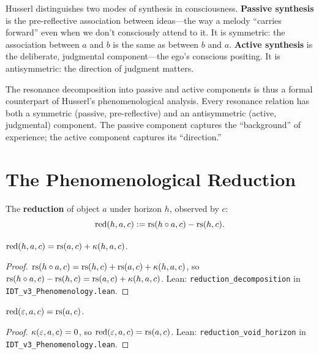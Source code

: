 \begin{interpretation}
\label{interp:two-syntheses}
Husserl distinguishes two modes of synthesis in consciousness.
\textbf{Passive synthesis} is the pre-reflective association between ideas---the
way a melody ``carries forward'' even when we don't consciously attend to it.
It is symmetric: the association between $a$ and $b$ is the same as between
$b$ and $a$. \textbf{Active synthesis} is the deliberate, judgmental component---the
ego's conscious positing. It is antisymmetric: the direction of judgment matters.

The resonance decomposition into passive and active components is thus a formal
counterpart of Husserl's phenomenological analysis. Every resonance relation
has both a symmetric (passive, pre-reflective) and an antisymmetric (active,
judgmental) component. The passive component captures the ``background'' of
experience; the active component captures its ``direction.''
\end{interpretation}

\section{The Phenomenological Reduction}

\begin{definition}
\label{def:reduction}
The \textbf{reduction} of object $a$ under horizon $h$, observed by $c$:
\[
\mathrm{red}(h, a, c) := \mathrm{rs}(h \circ a, c) - \mathrm{rs}(h, c).
\]
\end{definition}

\begin{theorem}
\label{thm:reduction-decomp}
$\mathrm{red}(h, a, c) = \mathrm{rs}(a, c) + \kappa(h, a, c)$.
\end{theorem}

\begin{proof}
$\mathrm{rs}(h \circ a, c) = \mathrm{rs}(h,c) + \mathrm{rs}(a,c) + \kappa(h,a,c)$, so
$\mathrm{rs}(h \circ a, c) - \mathrm{rs}(h,c) = \mathrm{rs}(a,c) + \kappa(h,a,c)$.
Lean: \texttt{reduction\_decomposition} in \texttt{IDT\_v3\_Phenomenology.lean}.
\end{proof}

\begin{theorem}
\label{thm:reduction-void}
$\mathrm{red}(\varepsilon, a, c) = \mathrm{rs}(a, c)$.
\end{theorem}

\begin{proof}
$\kappa(\varepsilon, a, c) = 0$, so $\mathrm{red}(\varepsilon, a, c) = \mathrm{rs}(a, c)$.
Lean: \texttt{reduction\_void\_horizon} in \texttt{IDT\_v3\_Phenomenology.lean}.
\end{proof}

